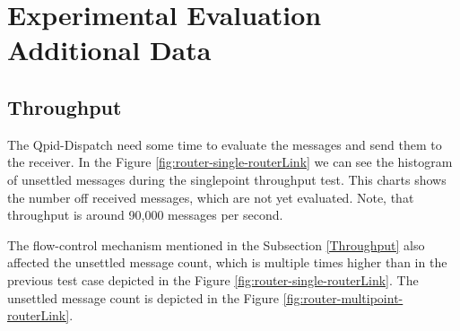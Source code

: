 \chapter{Experimental Evaluation Additional Data}
\label{Experimental Evaluation Additional Data}

\section*{Throughput}
The Qpid-Dispatch need some time to evaluate the messages and send them to the receiver. In the Figure \ref{fig:router-single-routerLink} we can see the histogram of unsettled messages during the singlepoint throughput test. This charts shows the number off received messages, which are not yet evaluated. Note, that throughput is around 90,000 messages per second.

The flow-control mechanism mentioned in the Subsection \ref{Throughput} also affected the unsettled message count, which is multiple times higher than in the previous test case depicted in the Figure \ref{fig:router-single-routerLink}. The unsettled message count is depicted in the Figure \ref{fig:router-multipoint-routerLink}.

